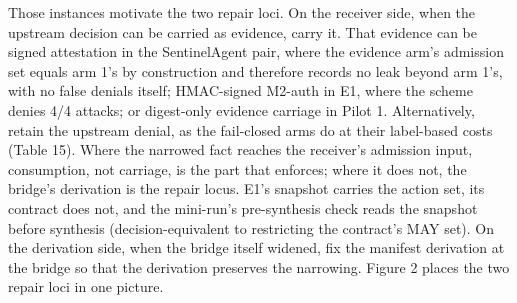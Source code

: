 \documentclass[
  10pt,
]{article}
\renewcommand{\_}{\allowbreak\origunderscore}
\begin{document}
Those instances motivate the two repair loci. On the receiver side, when
the upstream decision can be carried as evidence, carry it. That
evidence can be signed attestation in the SentinelAgent pair, where the
evidence arm's admission set equals arm 1's by construction and
therefore records no leak beyond arm 1's, with no false denials itself;
HMAC-signed M2-auth in E1, where the scheme denies 4/4 attacks; or
digest-only evidence carriage in Pilot 1. Alternatively, retain the
upstream denial, as the fail-closed arms do at their label-based costs
(Table 15). Where the narrowed fact reaches the receiver's admission
input, consumption, not carriage, is the part that enforces; where it
does not, the bridge's derivation is the repair locus. E1's snapshot
carries the action set, its contract does not, and the mini-run's
pre-synthesis check reads the snapshot before synthesis
(decision-equivalent to restricting the contract's MAY set). On the
derivation side, when the bridge itself widened, fix the manifest
derivation at the bridge so that the derivation preserves the narrowing.
Figure 2 places the two repair loci in one picture.
\end{document}
